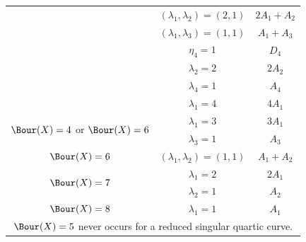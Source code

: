 \documentclass[11pt]{amsart} %
\theoremstyle{definition}
\begin{document}
{\begin{table}[htp]
\begin{tabular}{|c|c|c|}
& $(\lambda_1,\lambda_2)=(2,1)$ & $2A_1+A_2$ \\
& $(\lambda_1,\lambda_3)=(1,1)$ & $A_1+A_3$ \\
& $\eta_4=1$ & $D_4$ \\
& $\lambda_2=2$ & $2A_2$ \\
& $\lambda_4=1$ & $A_4$ \\
& $\lambda_1=4$ & $4A_1$ \\
\hline
\multirow{2}{*}{$\Bour(X)=4$ or $\Bour(X)=6$}
& $\lambda_1=3$ & $3A_1$ \\
& $\lambda_3=1$ & $A_3$ \\
\hline
$\Bour(X)=6$
& $(\lambda_1,\lambda_2)=(1,1)$ & $A_1+A_2$ \\
\hline
\multirow{2}{*}{$\Bour(X)=7$}
& $\lambda_1=2$ & $2A_1$ \\
& $\lambda_2=1$ & $A_2$ \\
\hline
$\Bour(X)=8$ & $\lambda_1=1$ & $A_1$ \\
\hline
\multicolumn{3}{|c|}{$\Bour(X)=5$ never occurs for a reduced singular quartic curve.}\\
\hline
\end{tabular}
\label{quartic-bour-table}
\end{table}}
\end{document}
